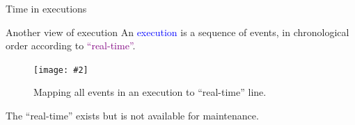 \documentclass{beamer}
\makeatletter
\newcommand{\citeinbeamer}[3]{{\scriptsize{\textcolor{blue}{[#1@#2'#3]}}}}
\newcommand{\fig}[3]
{
  \begin{figure}[htp]
    \centering
      \texttt{[image: \#2]}
      \caption[labelInTOC]{#3}
  \end{figure}
}
\newcommand{\largepurple}[1]{\textcolor{purple}{\large #1}}
\newcommand{\largeblue}[1]{\textcolor{blue}{\large #1}}
\makeatother
\begin{document}

\begin{frame}{Time in executions}
  \begin{block}{Another view of execution}
    An \largeblue{execution} is a sequence of events, in chronological order
  according to \largepurple{``real-time''}.
  \end{block}

  \fig{width = 0.65\textwidth}{fig/execution-to-real-time.pdf}
  {Mapping all events in an execution to ``real-time'' line.}

  \begin{alertblock}{The ``real-time'' exists but is not available for
  maintenance.}
  \end{alertblock}
\end{frame}

\end{document}
